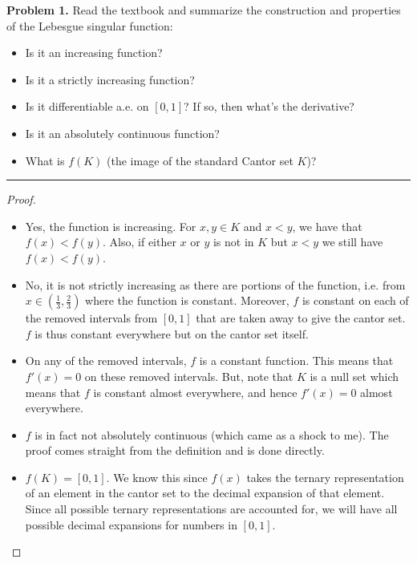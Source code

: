\documentclass[leqno]{article}
\theoremstyle{nonumberplain}
\newtheorem{proof}{Proof}
\begin{document}
\pagebreak


\noindent\textbf{Problem 1.} \quad
Read the textbook and summarize the construction and properties of the Lebesgue singular function:
\begin{itemize}
\item Is it an increasing function?
\item Is it a strictly increasing function?
\item Is it differentiable a.e. on $[0,1]$? If so, then what's the derivative?
\item Is it an absolutely continuous function?
\item What is $f(K)$ (the image of the standard Cantor set $K$)?
\end{itemize}

\noindent\rule[0.5ex]{\linewidth}{1pt}

\begin{proof}~
\begin{itemize}
\item Yes, the function is increasing. For $x,y \in K$ and $x<y$, we have that $f(x)<f(y)$.  Also, if either $x$ or $y$ is not in $K$ but $x<y$ we still have $f(x)<f(y)$.
\item No, it is not strictly increasing as there are portions of the function, i.e. from $x\in \left(\frac{1}{3}, \frac{2}{3}\right)$ where the function is constant. Moreover, $f$ is constant on each of the removed intervals from $[0,1]$ that are taken away to give the cantor set. $f$ is thus constant everywhere but on the cantor set itself.
\item On any of the removed intervals, $f$ is a constant function.  This means that $f'(x)=0$ on these removed intervals.  But, note that $K$ is a null set which means that $f$ is constant almost everywhere, and hence $f'(x)=0$ almost everywhere.
\item $f$ is in fact not absolutely continuous (which came as a shock to me).  The proof comes straight from the definition and is done directly.
\item $f(K)=[0,1]$.  We know this since $f(x)$ takes the ternary representation of an element in the cantor set to the decimal expansion of that element.  Since all possible ternary representations are accounted for, we will have all possible decimal expansions for numbers in $[0,1]$.
\end{itemize}
\end{proof}
\end{document}
